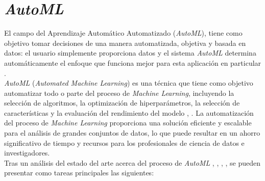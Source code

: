          
\section{\textit{AutoML}}
El campo del Aprendizaje Automático Automatizado (\textit{AutoML}), tiene como objetivo tomar decisiones de una manera automatizada, objetiva y basada en datos: el usuario simplemente proporciona datos y el sistema \textit{AutoML} determina automáticamente el enfoque que funciona mejor para esta aplicación en particular \citep{hutter2019automated}. \\
\textit{AutoML} (\textit{Automated Machine Learning}) es una técnica que tiene como objetivo automatizar todo o parte del proceso de \textit{Machine Learning}, incluyendo la selección de algoritmos, la optimización de hiperparámetros, la selección de características y la evaluación del rendimiento del modelo \citep{he2021automl}, \citep{tuggener2019automated}. La automatización del proceso de \textit{Machine Learning} proporciona una solución eficiente y escalable para el análisis de grandes conjuntos de datos, lo que puede resultar en un ahorro significativo de tiempo y recursos para los profesionales de ciencia de datos e investigadores. \\ 
Tras un análisis del estado del arte acerca del proceso de \textit{AutoML} \citep{tuggener2019automated}, \citep{waring2020automated}, \citep{hutter2019automated}, \citep{he2021automl}, se pueden presentar como tareas principales las siguientes:
